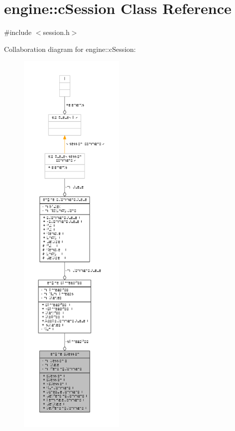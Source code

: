 \hypertarget{classengine_1_1cSession}{\section{engine\-:\-:c\-Session Class Reference}
\label{classengine_1_1cSession}
}


{\ttfamily \#include $<$session.\-h$>$}



Collaboration diagram for engine\-:\-:c\-Session\-:
\nopagebreak
\begin{figure}[H]
\begin{center}
\leavevmode
\includegraphics[height=550pt]{classengine_1_1cSession__coll__graph}
\end{center}
\end{figure}
